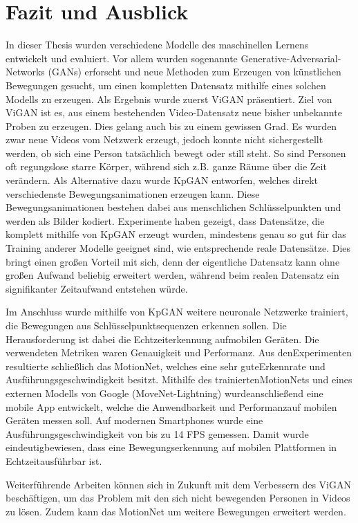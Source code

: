 \chapter{Fazit und Ausblick}
In dieser Thesis wurden verschiedene Modelle des maschinellen Lernens entwickelt
und evaluiert. Vor allem wurden sogenannte Generative-Adversarial-Networks
(GANs) erforscht und neue Methoden zum Erzeugen von künstlichen Bewegungen
gesucht, um einen kompletten Datensatz mithilfe eines solchen Modells zu
erzeugen. Als Ergebnis wurde zuerst ViGAN präsentiert. Ziel von ViGAN ist es,
aus einem bestehenden Video-Datensatz neue bisher unbekannte Proben zu erzeugen.
Dies gelang auch bis zu einem gewissen Grad. Es wurden zwar neue Videos vom
Netzwerk erzeugt, jedoch konnte nicht sichergestellt werden, ob sich eine Person
tatsächlich bewegt oder still steht.  So sind Personen oft regungslose starre
Körper, während sich z.B. ganze Räume über die Zeit verändern. Als Alternative
dazu wurde KpGAN entworfen, welches direkt verschiedenste Bewegungsanimationen
erzeugen kann. Diese Bewegungsanimationen bestehen dabei aus menschlichen
Schlüsselpunkten und werden als Bilder kodiert.  Experimente haben gezeigt, dass
Datensätze, die komplett mithilfe von KpGAN erzeugt wurden, mindestens genau so
gut für das Training anderer Modelle geeignet sind, wie entsprechende reale
Datensätze.  Dies bringt einen großen Vorteil mit sich, denn der eigentliche
Datensatz kann ohne großen Aufwand beliebig erweitert werden, während beim
realen Datensatz ein signifikanter Zeitaufwand entstehen würde.

Im Anschluss wurde mithilfe von KpGAN weitere neuronale Netzwerke trainiert, die
Bewegungen aus Schlüsselpunktsequenzen erkennen sollen.  Die Herausforderung ist
dabei die Echtzeiterkennung aufmobilen Geräten. Die verwendeten Metriken waren
Genauigkeit und Performanz. Aus denExperimenten resultierte schließlich das
MotionNet, welches eine sehr guteErkennrate und Ausführungsgeschwindigkeit
besitzt.  Mithilfe des trainiertenMotionNets und eines externen Modells von
Google (MoveNet-Lightning) wurdeanschließend eine mobile App entwickelt, welche
die Anwendbarkeit und Performanzauf mobilen Geräten messen soll. Auf modernen
Smartphones wurde eine Aus\-führ\-ungs\-ge\-schwindig\-keit von bis zu 14 FPS gemessen.
Damit wurde eindeutigbewiesen, dass eine Bewegungserkennung auf mobilen
Plattformen in Echtzeitausführbar ist.

Weiterführende Arbeiten können sich in Zukunft mit dem Verbessern des ViGAN
be\-schäf\-tigen, um das Problem mit den sich nicht bewegenden Personen in
Videos zu lösen. Zudem kann das MotionNet um weitere Bewegungen erweitert
werden.